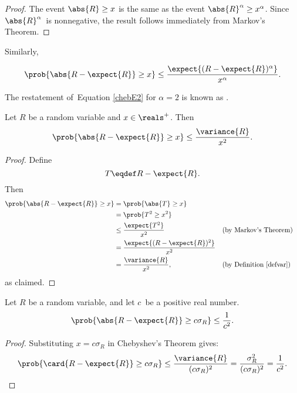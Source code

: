 \begin{proof}
The event $\abs{R} \ge x$ is the same as the event $\abs{R}^\alpha \ge
x^\alpha$.  Since $\abs{R}^\alpha$~is nonnegative, the result follows
immediately from Markov's Theorem.
\end{proof}

Similarly,

\begin{equation}\label{chebE2}
\prob{\abs{R - \expect{R}} \geq x}
    \leq \frac{\expect{(R - \expect{R})^\alpha}}{x^\alpha}.
\end{equation}

The restatement of~Equation \ref{chebE2} for $\alpha=2$ is known as
.
\begin{theorem}[Chebyshev]\label{chebthm}
  Let $R$ be a random variable and $x \in \reals^+$.  Then
\[
\prob{\abs{R - \expect{R}} \geq x} \leq \frac{\variance{R}}{x^2}.
\]
\end{theorem}

\begin{proof}

Define
\begin{equation*}
    T \eqdef R - \expect{R}.
\end{equation*}
Then
\begin{align*}
\prob{ \abs{R - \expect{R}} \ge x }
    &= \prob{\abs{T} \ge x} \\
     &= \prob{T^2 \ge x^2} \\
     &\le \frac{\expect{T^2}}{x^2} && \text{(by Markov's Theorem)} \\
     & = \frac{ \expect{ (R - \expect{R})^2 } }{x^2} \\
     &= \frac{\variance{R}}{x^2},  && \text{(by Definition~\ref{defvar})}
\end{align*}
as claimed.
\end{proof}


\begin{corollary}
\label{cor:cheby}
Let $R$ be a random variable, and let $c$~be a positive real number.
\[
\prob{\abs{R - \expect{R}} \geq c \sigma_R} \leq \frac{1}{c^2}.
\]
\end{corollary}

\begin{proof}
  Substituting $x = c \sigma_R$ in Chebyshev's Theorem gives:
  \begin{equation*}
    \prob{\card{R - \expect{R}} \geq c \sigma_R}
    \leq
    \frac{\variance{R}}{(c \sigma_R)^2}
    =  \frac{\sigma_R^2}{(c \sigma_R)^2}
    = \frac{1}{c^2}.\qedhere
  \end{equation*}
\end{proof}

